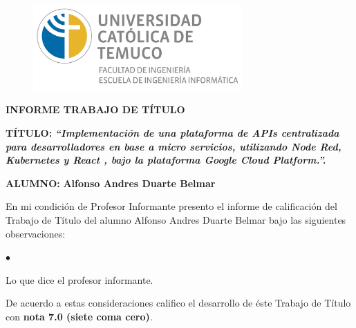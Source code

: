 
\thispagestyle{empty}
\begin{titlepage}

{
\begin{center}
\vspace*{-1in}
\begin{figure}[htb]
\begin{center}
\includegraphics[width=8cm]{./figuras/logo_informatica.jpg}
\end{center}
\end{figure}

\vspace*{0.2in}
\textbf{ \normalsize{INFORME TRABAJO DE TÍTULO}} \\
\vspace*{0.2in}
\begin{flushleft}
\textbf{ \normalsize{TÍTULO:}} \hspace*{0.2in} \textbf{ \textit{ \normalsize{``Implementación de una plataforma de APIs centralizada para desarrolladores en base a micro servicios, utilizando Node Red, Kubernetes y React , bajo la plataforma Google Cloud Platform.''.}}}
\end{flushleft}
\vspace*{0.1in}
\begin{flushleft}
\textbf{ \normalsize{ALUMNO:}} \hspace*{0.2in} \textbf{ \normalsize{Alfonso Andres Duarte Belmar}}
\end{flushleft}
\vspace*{0.3in}

\begin{flushleft}

\hspace{1cm} En mi condición de Profesor Informante presento el informe de calificación del Trabajo de Título del alumno
  Alfonso Andres Duarte Belmar bajo las siguientes observaciones:

\begin{list}{$\bullet$}{}
  \item Lo que dice el profesor informante.
\end{list}

\hspace{1cm} De acuerdo a estas consideraciones califico el desarrollo de éste Trabajo de Título con \textbf {nota 7.0 (siete coma cero)}.
\end{flushleft}


\end{center}}
\end{titlepage}
